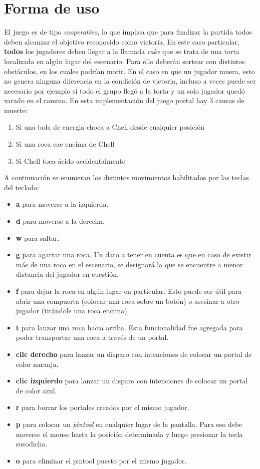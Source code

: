 \documentclass[a4paper]{article}
\begin{document}
\section{Forma de uso}
El juego es de tipo \textit{cooperativo}, lo que implica que para finalizar la partida todos deben alcanzar el objetivo reconocido como victoria. En este caso particular, \textbf{todos} los jugadores deben llegar a la llamada \textit{cake} que se trata de una torta localizada en algún lugar del escenario. Para ello deberán sortear con distintos obstáculos, en los cuales podrían morir. En el caso en que un jugador muera, esto no genera ninguna diferencia en la condición de victoria, incluso a veces puede ser necesario por ejemplo si todo el grupo llegó a la torta y un solo jugador quedó varado en el camino. En esta implementación del juego portal hay 3 causas de muerte:
\begin{enumerate}
	\item Si una bola de energia choca a Chell desde cualquier posición
	\item Si una roca cae encima de Chell
	\item Si Chell toca ácido accidentalmente
\end{enumerate}

A continuación se enumeran los distintos movimientos habilitados por las teclas del teclado:
\begin{itemize}
	\item \textbf{a} para moverse a la izquierda.
	\item \textbf{d} para moverse a la derecha.
	\item \textbf{w} para saltar.
	\item \textbf{g} para agarrar una roca. Un dato a tener en cuenta es que en caso de existir más de una roca en el escenario, se designará la que se encuentre a menor distancia del jugador en cuestión.
	\item \textbf{f} para dejar la roca en algún lugar en particular. Esto puede ser útil para abrir una compuerta (colocar una roca sobre un botón) o asesinar a otro jugador (tirándole una roca encima).
	\item \textbf{t} para lanzar una roca hacia arriba. Esta funcionalidad fue agregada para poder transportar una roca a través de un portal.
	\item \textbf{clic derecho} para lanzar un disparo con intenciones de colocar un portal de color naranja. 
	\item \textbf{clic izquierdo} para lanzar un disparo con intenciones de colocar un portal de color azul. 
	\item \textbf{r} para borrar los portales creados por el mismo jugador.
	\item \textbf{p} para colocar un \textit{pintool} en cualquier lugar de la pantalla. Para eso debe moverse el mouse hasta la posición determinada y luego presionar la tecla susodicha.
	\item \textbf{o} para eliminar el pintool puesto por el mismo jugador.
\end{itemize}
\end{document}
